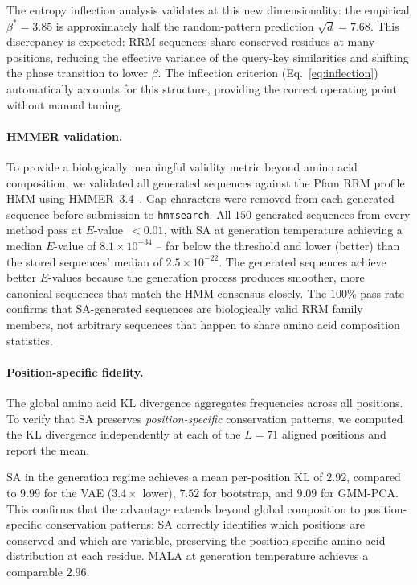 The entropy inflection analysis validates at this new dimensionality: the empirical $\beta^*{=}3.85$ is approximately half the random-pattern prediction $\sqrt{d}{=}7.68$. This discrepancy is expected: RRM sequences share conserved residues at many positions, reducing the effective variance of the query-key similarities and shifting the phase transition to lower $\beta$. The inflection criterion (Eq.~\ref{eq:inflection}) automatically accounts for this structure, providing the correct operating point without manual tuning.

\paragraph{HMMER validation.}
To provide a biologically meaningful validity metric beyond amino acid composition, we validated all generated sequences against the Pfam RRM profile HMM using HMMER~3.4~\cite{hmmer3}. Gap characters were removed from each generated sequence before submission to \texttt{hmmsearch}. All $150$ generated sequences from every method pass at $E$-value~$<0.01$, with SA at generation temperature achieving a median $E$-value of $8.1{\times}10^{-34}$ -- far below the threshold and lower (better) than the stored sequences' median of $2.5{\times}10^{-22}$. The generated sequences achieve better $E$-values because the generation process produces smoother, more canonical sequences that match the HMM consensus closely. The $100\%$ pass rate confirms that SA-generated sequences are biologically valid RRM family members, not arbitrary sequences that happen to share amino acid composition statistics.

\paragraph{Position-specific fidelity.}
The global amino acid KL divergence aggregates frequencies across all positions. To verify that SA preserves \emph{position-specific} conservation patterns, we computed the KL divergence independently at each of the $L{=}71$ aligned positions and report the mean.

SA in the generation regime achieves a mean per-position KL of $2.92$, compared to $9.99$ for the VAE ($3.4{\times}$ lower), $7.52$ for bootstrap, and $9.09$ for GMM-PCA. This confirms that the advantage extends beyond global composition to position-specific conservation patterns: SA correctly identifies which positions are conserved and which are variable, preserving the position-specific amino acid distribution at each residue. MALA at generation temperature achieves a comparable $2.96$.

